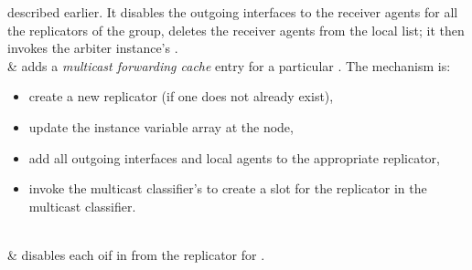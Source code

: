 \begin{alist}
        described earlier.  It disables the outgoing interfaces to the
        receiver agents for all the replicators of the group, deletes
        the receiver agents from the local  list; it
        then invokes the arbiter instance's
        .\\[2ex]
 &
         adds a \textit{multicast forwarding cache}
        entry for a particular .
        The mechanism is:
        \begin{itemize}
        \item create a new replicator (if one does not already exist),
        \item update the  instance variable array at the node,
        \item add all outgoing interfaces and local agents to the
            appropriate replicator,
        \item invoke the multicast classifier's 
            to create a slot for the replicator in the multicast
            classifier.
        \end{itemize} \\
 &
        disables each oif in  from the replicator for .\\
\end{alist}

